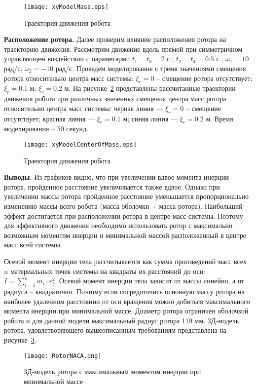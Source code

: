 \begin{figure}[!ht]
	\centering
	\texttt{[image: xyModelMass.eps]}
	\caption{Траектория движения робота}
	\label{xyModelMass}
\end{figure}

\textbf{Расположение ротора.} Далее проверим влияние расположения ротора на траекторию движения. Рассмотрим движение вдоль прямой при симметричном управляющем воздействии с параметарми $t_1=t_3=2$ с., $t_2=t_4 = 0.5$ с., $\omega_1=10$ рад/с, $\omega_2=-10$ рад/с. Проведем моделирование с тремя значениями смещения ротора относительно центра масс системы: $\xi_r = 0$ -- смещение ротора отсутствует; $\xi_r = 0.1$ м; $\xi_r = 0.2$ м. На рисунке~\ref{xyModelCenterOfMass} представлены рассчитанные траектории движения робота при различных значениях смещения центра масс ротора относительно центра масс системы: черная линия --- $\xi_r = 0$ -- смещение отсутствует; красная линия ---  $\xi_r = 0.1$ м; синяя линия --- $\xi_r = 0.2$ м. Время моделирования -- 50 секунд.

\begin{figure}[!ht]
	\centering
	\texttt{[image: xyModelCenterOfMass.eps]}
	\caption{Траектория движения робота}
	\label{xyModelCenterOfMass}
\end{figure}

\textbf{Выводы.} Из графиков видно, что при увеличении вдвое момента инерции ротора, пройденное расстояние увеличивается также вдвое. Однако при увеличении массы ротора пройденное расстояние уменьшается пропорционально изменению массы всего робота (масса оболочки + масса ротора). Наибольший эффект достигается при расположении ротора в центре масс системы. Поэтому для эффективного движения необходимо использовать ротор с максимально возможным моментом инерции и минимальной массой расположенный в центре масс всей системы.

Осевой момент инерции тела рассчитывается как сумма произведений масс всех $n$ материальных точек системы на квадраты их расстояний до оси: $I = \sum \limits_{i=1}^n m_i\cdot r_i^2$. Осевой момент инерции тела зависит от массы линейно, а от радиуса -- квадратично. Поэтому если сосредоточить основную массу ротора на наиболее удаленном расстоянии от оси вращения можно добиться максимального момента инерции при минимальной массе. Диаметр ротора ограничен оболочкой робота и для данной модели максимальный радиус ротора 110 мм. 3Д-модель ротора, удовлетворяющего вышеописанным требованиям представлена на рисунке~\ref{RotorNACA}.


\begin{figure}[!ht]
	\centering
	\texttt{[image: RotorNACA.png]}
	\caption{3Д-модель ротора с максимальным моментом инерции при минимальной массе}
	\label{RotorNACA}
\end{figure}





\clearpage